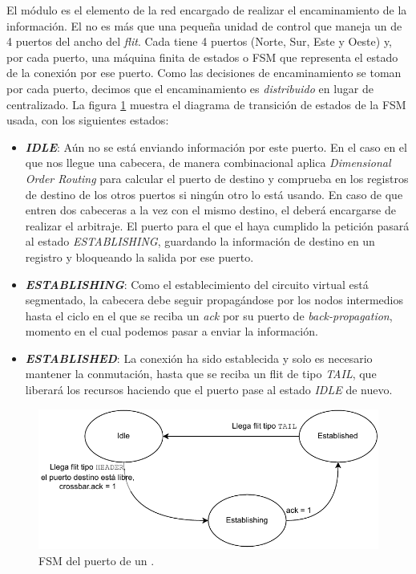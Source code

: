 El módulo  es el elemento de la red encargado de realizar el encaminamiento de la información. El  no es más que una pequeña unidad de control que maneja un  de 4 puertos del ancho del \textit{flit}. Cada  tiene 4 puertos (Norte, Sur, Este y Oeste) y, por cada puerto, una máquina finita de estados o FSM que representa el estado de la conexión por ese puerto. Como las decisiones de encaminamiento se toman por cada puerto, decimos que el encaminamiento es \textit{distribuido} en lugar de centralizado. La figura \ref{fig:router_fsm} muestra el diagrama de transición de estados de la FSM usada, con los siguientes estados:
\begin{itemize}
    \item \textbf{\textit{IDLE}}: Aún no se está enviando información por este puerto. En el caso en el que nos llegue una cabecera, de manera combinacional aplica \textit{Dimensional Order Routing} para calcular el puerto de destino y comprueba en los registros de destino de los otros puertos si ningún otro  lo está usando. En caso de que entren dos cabeceras a la vez con el mismo destino, el  deberá encargarse de realizar el arbitraje. El puerto para el que el  haya cumplido la petición pasará al estado \textit{ESTABLISHING}, guardando la información de destino en un registro y bloqueando la salida por ese puerto.
    \item \textbf{\textit{ESTABLISHING}}: Como el establecimiento del circuito virtual está segmentado, la cabecera debe seguir propagándose por los nodos intermedios hasta el ciclo en el que se reciba un \textit{ack} por su puerto de \textit{back-propagation}, momento en el cual podemos pasar a enviar la información.
    \item \textbf{\textit{ESTABLISHED}}: La conexión ha sido establecida y solo es necesario mantener la conmutación, hasta que se reciba un flit de tipo \textit{TAIL}, que liberará los recursos haciendo que el puerto pase al estado \textit{IDLE} de nuevo.
\end{itemize}

\begin{figure}[h]
    \centering
    \includegraphics[width=12cm]{images/diagrams/router_fsm.drawio.pdf}
    \caption[Máquina de Estados Finita del puerto de un encaminador.]{FSM del puerto de un .}
    \label{fig:router_fsm}
\end{figure}

